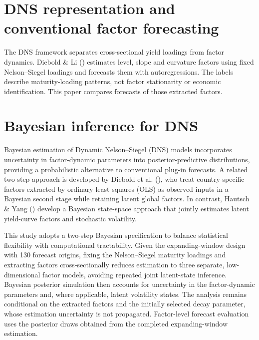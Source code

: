 \documentclass[
  12pt,
  letterpaper,
  DIV=11,
  numbers=noendperiod]{scrreprt}
\begin{document}
\section{DNS representation and conventional factor
forecasting}\label{dns-representation-and-conventional-factor-forecasting}

The DNS framework separates cross-sectional yield loadings from factor
dynamics. Diebold \& Li ()
estimates level, slope and curvature factors using fixed Nelson--Siegel
loadings and forecasts them with autoregressions. The labels describe
maturity-loading patterns, not factor stationarity or economic
identification. This paper compares forecasts of those extracted
factors.

\section{Bayesian inference for DNS}\label{bayesian-inference-for-dns}

Bayesian estimation of Dynamic Nelson--Siegel (DNS) models incorporates
uncertainty in factor-dynamic parameters into posterior-predictive
distributions, providing a probabilistic alternative to conventional
plug-in forecasts. A related two-step approach is developed by Diebold
et al. (), who treat
country-specific factors extracted by ordinary least squares (OLS) as
observed inputs in a Bayesian second stage while retaining latent global
factors. In contrast, Hautsch \& Yang
() develop a Bayesian
state-space approach that jointly estimates latent yield-curve factors
and stochastic volatility.

This study adopts a two-step Bayesian specification to balance
statistical flexibility with computational tractability. Given the
expanding-window design with 130 forecast origins, fixing the
Nelson--Siegel maturity loadings and extracting factors
cross-sectionally reduces estimation to three separate, low-dimensional
factor models, avoiding repeated joint latent-state inference. Bayesian
posterior simulation then accounts for uncertainty in the factor-dynamic
parameters and, where applicable, latent volatility states. The analysis
remains conditional on the extracted factors and the initially selected
decay parameter, whose estimation uncertainty is not propagated.
Factor-level forecast evaluation uses the posterior draws obtained from
the completed expanding-window estimation.
\end{document}
